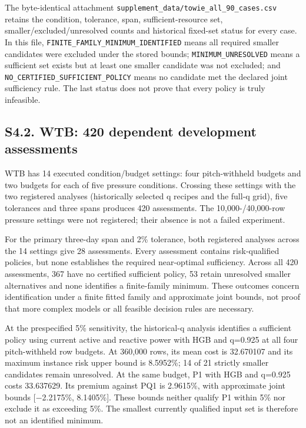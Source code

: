 \documentclass[
  british,
  11pt,
]{article}
\newcounter{none} %
\begin{document}
The byte-identical attachment
\texttt{supplement\_data/towie\_all\_90\_cases.csv} retains the
condition, tolerance, span, sufficient-resource set,
smaller/excluded/unresolved counts and historical fixed-set status for
every case. In this file, \texttt{FINITE\_FAMILY\_MINIMUM\_IDENTIFIED}
means all required smaller candidates were excluded under the stored
bounds; \texttt{MINIMUM\_UNRESOLVED} means a sufficient set exists but
at least one smaller candidate was not excluded; and
\texttt{NO\_CERTIFIED\_SUFFICIENT\_POLICY} means no candidate met the
declared joint sufficiency rule. The last status does not prove that
every policy is truly infeasible.

\subsection{S4.2. WTB: 420 dependent development
assessments}\label{s4.2.-wtb-420-dependent-development-assessments}

WTB has 14 executed condition/budget settings: four pitch-withheld
budgets and two budgets for each of five pressure conditions. Crossing
these settings with the two registered analyses (historically selected q
recipes and the full-q grid), five tolerances and three spans produces
420 assessments. The 10,000-/40,000-row pressure settings were not
registered; their absence is not a failed experiment.

For the primary three-day span and 2\% tolerance, both registered
analyses across the 14 settings give 28 assessments. Every assessment
contains risk-qualified policies, but none establishes the required
near-optimal sufficiency. Across all 420 assessments, 367 have no
certified sufficient policy, 53 retain unresolved smaller alternatives
and none identifies a finite-family minimum. These outcomes concern
identification under a finite fitted family and approximate joint
bounds, not proof that more complex models or all feasible decision
rules are necessary.

At the prespecified 5\% sensitivity, the historical-q analysis
identifies a sufficient policy using current active and reactive power
with HGB and q=0.925 at all four pitch-withheld row budgets. At 360,000
rows, its mean cost is 32.670107 and its maximum instance risk upper
bound is 8.5952\%; 14 of 21 strictly smaller candidates remain
unresolved. At the same budget, P1 with HGB and q=0.925 costs 33.637629.
Its premium against PQ1 is 2.9615\%, with approximate joint bounds
{[}−2.2175\%, 8.1405\%{]}. These bounds neither qualify P1 within 5\%
nor exclude it as exceeding 5\%. The smallest currently qualified input
set is therefore not an identified minimum.
\end{document}
